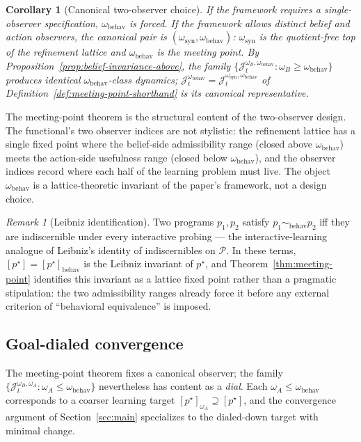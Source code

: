 \documentclass[11pt]{article}
\newtheorem{corollary}[theorem]{Corollary}
\theoremstyle{definition}
\theoremstyle{remark}
\newtheorem{remark}[theorem]{Remark}
\newcommand{\Pcal}{\mathcal{P}}
\begin{document}
\begin{corollary}[Canonical two-observer choice]
\label{cor:canonical-pair}
If the framework requires a single-observer specification, $\omega_{\mathrm{behav}}$ is forced. If the framework allows distinct belief and action observers, the canonical pair is $(\omega_{\mathrm{syn}},\omega_{\mathrm{behav}})$: $\omega_{\mathrm{syn}}$ is the quotient-free top of the refinement lattice and $\omega_{\mathrm{behav}}$ is the meeting point. By Proposition~\ref{prop:belief-invariance-above}, the family $\{\mathcal J_t^{\omega_B,\omega_{\mathrm{behav}}}:\omega_B\ge\omega_{\mathrm{behav}}\}$ produces identical $\omega_{\mathrm{behav}}$-class dynamics; $\mathcal J_t^{\omega_{\mathrm{behav}}}=\mathcal J_t^{\omega_{\mathrm{syn}},\omega_{\mathrm{behav}}}$ of Definition~\ref{def:meeting-point-shorthand} is its canonical representative.
\end{corollary}

The meeting-point theorem is the structural content of the two-observer design. The functional's two observer indices are not stylistic: the refinement lattice has a single fixed point where the belief-side admissibility range (closed above $\omega_{\mathrm{behav}}$) meets the action-side usefulness range (closed below $\omega_{\mathrm{behav}}$), and the observer indices record where each half of the learning problem must live. The object $\omega_{\mathrm{behav}}$ is a lattice-theoretic invariant of the paper's framework, not a design choice.

\begin{remark}[Leibniz identification]
\label{rem:leibniz}
Two programs $p_1,p_2$ satisfy $p_1\sim_{\mathrm{behav}}p_2$ iff they are indiscernible under every interactive probing --- the interactive-learning analogue of Leibniz's identity of indiscernibles on $\Pcal$. In these terms, $[p^\star]=[p^\star]_{\mathrm{behav}}$ is the Leibniz invariant of $p^\star$, and Theorem~\ref{thm:meeting-point} identifies this invariant as a lattice fixed point rather than a pragmatic stipulation: the two admissibility ranges already force it before any external criterion of ``behavioral equivalence'' is imposed.
\end{remark}

\subsection{Goal-dialed convergence}
\label{sec:goal-dialed}

The meeting-point theorem fixes a canonical observer; the family $\{\mathcal J_t^{\omega_B,\omega_A}:\omega_A\le\omega_{\mathrm{behav}}\}$ nevertheless has content as a \emph{dial}. Each $\omega_A\le\omega_{\mathrm{behav}}$ corresponds to a coarser learning target $[p^\star]_{\omega_A}\supseteq[p^\star]$, and the convergence argument of Section~\ref{sec:main} specializes to the dialed-down target with minimal change.
\end{document}
